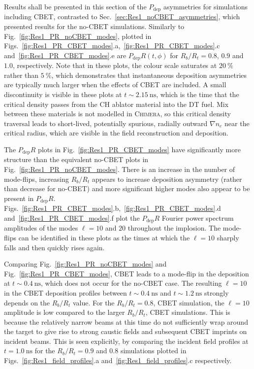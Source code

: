 Results shall be presented in this section of the $P_{\text{dep}}$ asymmetries for simulations including \ac{CBET}, contrasted to Sec.~\ref{sec:Res1_noCBET_asymmetries}, which presented results for the no-\ac{CBET} simulations.
Similarly to Fig.~\ref{fig:Res1_PR_noCBET_modes}, plotted in Figs.~\ref{fig:Res1_PR_CBET_modes}.a,~\ref{fig:Res1_PR_CBET_modes}.c and~\ref{fig:Res1_PR_CBET_modes}.e are $P_{\text{dep}}R(t,\phi)$ for $R_b/R_t=0.8$, $0.9$ and $1.0$, respectively.
Note that in these plots, the colour scale saturates at $20\ \%$ rather than $5\ \%$, which demonstrates that instantaneous deposition asymmetries are typically much larger when the effects of \ac{CBET} are included.
A small discontinuity is visible in these plots at $t\sim2.15\ \text{ns}$, which is the time that the critical density passes from the CH ablator material into the DT fuel.
Mix between these materials is not modelled in \textsc{Chimera}, so this critical density traversal leads to short-lived, potentially spurious, radially outward $\nabla n_e$ near the critical radius, which are visible in the field reconstruction and deposition.

The $P_{\text{dep}}R$ plots in Fig.~\ref{fig:Res1_PR_CBET_modes} have significantly more structure than the equivalent no-\ac{CBET} plots in Fig.~\ref{fig:Res1_PR_noCBET_modes}.
There is an increase in the number of mode-flips, increasing $R_b/R_t$ appears to increase deposition asymmetry (rather than decrease for no-\ac{CBET}) and more significant higher modes also appear to be present in $P_{\text{dep}}R$.
Figs.~\ref{fig:Res1_PR_CBET_modes}.b,~\ref{fig:Res1_PR_CBET_modes}.d and~\ref{fig:Res1_PR_CBET_modes}.f plot the $P_{\text{dep}}R$ Fourier power spectrum amplitudes of the modes $\ell=10$ and $20$ throughout the implosion.
The mode-flips can be identified in these plots as the times at which the $\ell=10$ sharply falls and then quickly rises again.

Comparing Fig.~\ref{fig:Res1_PR_noCBET_modes} and Fig.~\ref{fig:Res1_PR_CBET_modes}, \ac{CBET} leads to a mode-flip in the deposition at $t\sim0.4\ \text{ns}$, which does not occur for the no-\ac{CBET} case.
The resulting $\ell=10$ in the \ac{CBET} deposition profiles between $t\sim0.4\ \text{ns}$ and $t\sim1.2\ \text{ns}$ strongly depends on the $R_b/R_t$ value.
For the $R_b/R_t=0.8$, \ac{CBET} simulation, the $\ell=10$ amplitude is low compared to the larger $R_b/R_t$, \ac{CBET} simulations.
This is because the relatively narrow beams at this time do not sufficiently wrap around the target to give rise to strong caustic fields and subsequent \ac{CBET} imprints on incident beams.
This is seen explicitly, by comparing the incident field profiles at $t=1.0\ \text{ns}$ for the $R_b/R_t=0.9$ and $0.8$ simulations plotted in Figs.~\ref{fig:Res1_field_profiles}.a and~\ref{fig:Res1_field_profiles}.c respectively.

